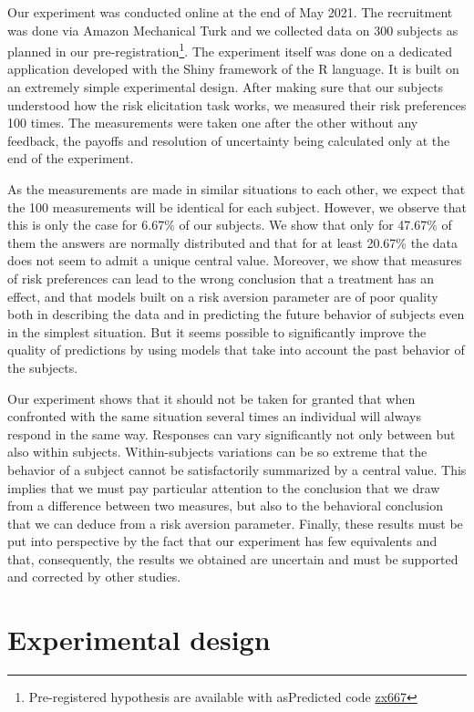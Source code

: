 \documentclass[
]{book}
\begin{document}
Our experiment was conducted online at the end of May 2021.
The recruitment was done via Amazon Mechanical Turk and we collected data on
300 subjects as planned in our pre-registration\footnote{Pre-registered hypothesis are available with asPredicted code
  \href{https://aspredicted.org/zx667.pdf}{zx667}}.
The experiment itself was done on a dedicated application developed with the
Shiny framework of the R language.
It is built on an extremely simple experimental design. After making sure
that our subjects understood how the risk elicitation task works, we
measured their risk preferences 100 times.
The measurements were taken one after the other without any feedback, the
payoffs and resolution of uncertainty being calculated only at the end of the
experiment.

As the measurements are made in similar situations to each other, we
expect that the 100 measurements will be identical for each subject.
However, we observe that this is only the case for
6.67\% of our subjects.
We show that only for
47.67\% of them the answers are
normally distributed and that for at least
20.67\% the data does
not seem to admit a unique central value. Moreover, we show that
measures of risk preferences can lead to the wrong conclusion that a
treatment has an effect,
and that models built on a risk aversion
parameter are of poor quality both in describing the data and in
predicting the future behavior of subjects even in the simplest
situation.
But it seems possible to significantly improve the quality of
predictions by using models that take into account the past behavior of
the subjects.

Our experiment shows that it should not be taken for granted that when
confronted with the same situation several times an individual will
always respond in the same way.
Responses can vary significantly not only between but also within subjects.
Within-subjects variations can be so extreme
that the behavior of a subject cannot be satisfactorily summarized
by a central value.
This implies that we must pay particular attention
to the conclusion that we draw from a difference between two measures,
but also to the behavioral conclusion that we can deduce from a risk
aversion parameter.
Finally, these results must be put into perspective
by the fact that our experiment has few equivalents and that,
consequently, the results we obtained are uncertain and must be
supported and corrected by other studies.

\hypertarget{mm4}{%
\section{Experimental design}\label{mm4}}
\end{document}
